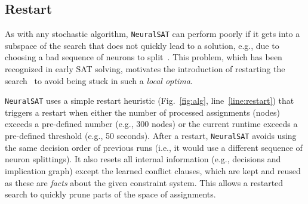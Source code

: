 \documentclass[oneside,11pt,dvipsnames]{book}
\numberwithin{equation}{section}
\theoremstyle{definition}
\theoremstyle{remark}
\newcommand{\tvn}[1]{\iftoggle{usecomment}{{\color{red}{[TVN]: #1}}}{}}
\newcommand{\hd}[1]{\iftoggle{usecomment}{{\color{blue}{[HD]: #1}}}{}}
\newcommand{\tool}{\texttt{NeuralSAT}}
\begin{document}
\subsection{Restart}\label{sec:restart}


As with any stochastic algorithm, \tool{} can perform poorly if it gets into a subspace of the search that does not quickly lead to a solution, e.g., due to choosing a bad sequence of neurons to split~\cite{bunel2018unified,de2021improved}.
This problem, which has been recognized in early SAT solving, motivates the introduction of restarting the search~\cite{gomes1998boosting} to avoid being stuck in such a \emph{local optima}.






\tool{} uses a simple restart heuristic (Fig.~\ref{fig:alg}, line~\ref{line:restart}) that triggers a restart when either the number of processed assignments (nodes) exceeds a pre-defined number (e.g., 300 nodes) or the current runtime exceeds a pre-defined threshold (e.g., 50 seconds).
After a restart, \tool{} avoids using the same decision order of previous runs (i.e., it would use a different sequence of neuron splittings). It also resets all internal information (e.g., decisions and implication graph) except the learned conflict clauses, which are kept and reused as these are \textit{facts} about the given constraint system.
This allows a restarted search to quickly prune parts of the  space of assignments.


\end{document}
